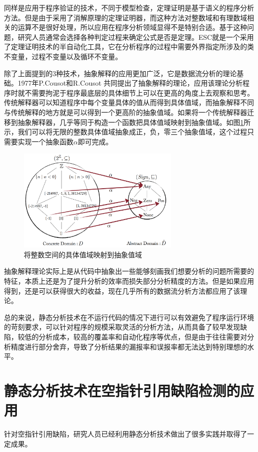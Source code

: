 同样是应用于程序验证的技术，不同于模型检查，定理证明是基于语义的程序分析方法。但是由于采用了消解原理的定理证明器，而这种方法对整数域和有理数域相关的运算不是很好处理，所以应用在程序分析领域显得不是特别合适。基于这种问题，研究人员通常会选择各种判定过程来确定公式是否是定理。ESC就是一个采用了定理证明技术的半自动化工具，它在分析程序的过程中需要外界指定所涉及的类不变量，过程不变量以及循环不变量。

除了上面提到的3种技术，抽象解释的应用更加广泛，它是数据流分析的理论基础。1977年P.Cousot和R.Cousot
共同提出了抽象解释的理论，应用该理论分析程序时就不需要拘泥于程序最底层的具体细节上可以在更高的角度上去观察和思考。传统解释器可以知道程序中每个变量具体的值从而得到具体值域，而抽象解释不同与传统解释的地方就是可以得到一个更高阶的抽象值域。如果将一个传统解释器迁移到抽象解释器，几乎等同于构造一个函数把具体值域映射到抽象值域。如图\ref{fig:figure2-1}所示，我们可以将无限的整数具体值域抽象成正，负，零三个抽象值域，这个过程只需要实现一个抽象函数$\alpha$即可完成。
 \begin{figure}
	\centering
	\includegraphics[width=0.70\textwidth]{figures/AbstractInterpretation2-1}
	\caption{将整数空间的具体值域映射到抽象值域}\label{fig:figure2-1}
\end{figure}

抽象解释理论实际上是从代码中抽象出一些能够刻画我们想要分析的问题所需要的特征，本质上还是为了提升分析的效率而损失部分分析精度的方法。但是如果应用得到，还是可以获得很大的收益，现在几乎所有的数据流分析方法都应用了该理论。

总的来说，静态分析技术在不运行代码的情况下进行可以有效避免了程序运行环境的苛刻要求，可以针对程序的规模采取灵活的分析方法，从而具备了较早发现缺陷，较低的分析成本，较高的覆盖率和自动化程序等优点，但是由于往往需要对分析精度进行部分舍弃，导致了分析结果的漏报率和误报率都无法达到特别理想的水平。

\section{静态分析技术在空指针引用缺陷检测的应用}
针对空指针引用缺陷，研究人员已经利用静态分析技术做出了很多实践并取得了一定成果。

